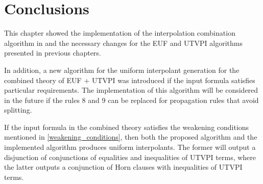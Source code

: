 \section{Conclusions}

This chapter showed the implementation of the
interpolation combination algorithm in 
\cite{10.1007/11532231_26} and the necessary
changes for the EUF and UTVPI algorithms
presented in previous chapters. 

In addition, a new algorithm for the uniform interpolant
generation for the combined theory of EUF + UTVPI 
was introduced if the input formula satisfies particular
requirements. The implementation of this algorithm
will be considered in the future if the rules 8 and 9
can be replaced for propagation rules that
avoid splitting. 

If the input formula in the combined theory 
satisfies the weakening conditions mentioned in
\ref{weakening_conditions}, then both
the proposed algorithm and the implemented algorithm
produces uniform interpolants. The former will 
output a disjunction of conjunctions of equalities 
and inequalities of UTVPI terms, where the latter outputs
a conjunction of Horn clauses with inequalities of
UTVPI terms.

